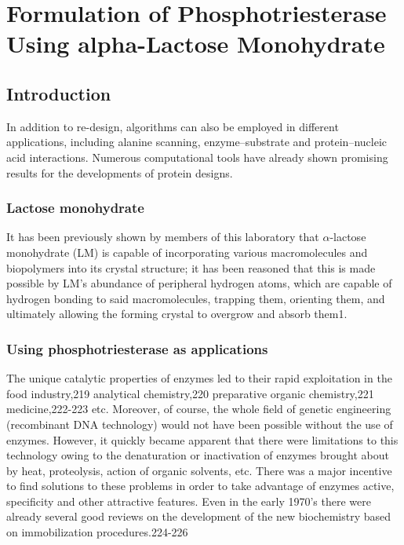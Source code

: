 \chapter{Formulation of Phosphotriesterase Using alpha-Lactose Monohydrate} 
\label{chap:lactose}

\begin{refsection}

\section{Introduction}

In addition to re-design, algorithms can also be employed in different
applications, including alanine scanning\cite{Massova1999,Kortemme2004a},
enzyme–substrate\cite{Bolon2001,Jiang2008} and protein–nucleic acid
interactions\cite{Ashworth2006}. Numerous computational tools have already
shown promising results for the developments of protein designs.

\subsection{Lactose monohydrate}

It has been previously shown by members of this laboratory that $\alpha$-lactose
monohydrate (LM) is capable of incorporating various macromolecules and
biopolymers into its crystal structure; it has been reasoned that this is made
possible by LM's abundance of peripheral hydrogen atoms, which are capable of
hydrogen bonding to said macromolecules, trapping them, orienting them, and
ultimately allowing the forming crystal to overgrow and absorb them1.

\subsection{Using phosphotriesterase as applications}

The unique catalytic properties of enzymes led to their rapid exploitation in
the food industry,219 analytical chemistry,220 preparative organic chemistry,221
medicine,222-223 etc. Moreover, of course, the whole field of genetic
engineering (recombinant DNA technology) would not have been possible without
the use of enzymes. However, it quickly became apparent that there were
limitations to this technology owing to the denaturation or inactivation of
enzymes brought about by heat, proteolysis, action of organic solvents, etc.
There was a major incentive to find solutions to these problems in order to
take advantage of enzymes active, specificity and other attractive features.
Even in the early 1970's there were already several good reviews on the
development of the new biochemistry based on immobilization procedures.224-226


\end{refsection}
